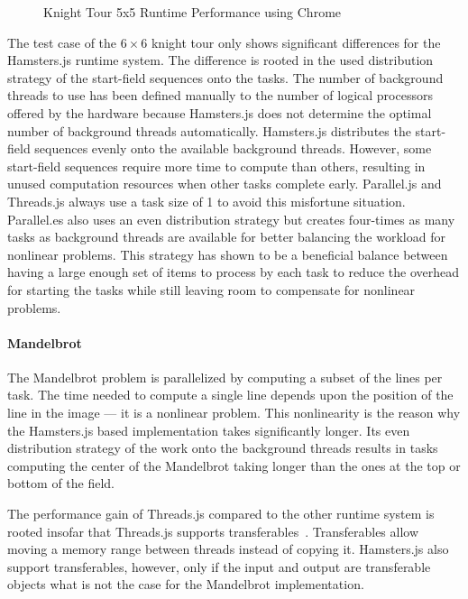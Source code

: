 \begin{figure}
	\centering
	
	\caption{Knight Tour 5x5 Runtime Performance using Chrome}
	\label{fig:runtime-performance-chrome}
\end{figure}

The test case of the $6\times6$ knight tour only shows significant differences for the Hamsters.js runtime system. The difference is rooted in the used distribution strategy of the start-field sequences onto the tasks. The number of background threads to use has been defined manually to the number of logical processors offered by the hardware because Hamsters.js does not determine the optimal number of background threads automatically. Hamsters.js distributes the start-field sequences evenly onto the available background threads. However, some start-field sequences require more time to compute than others, resulting in unused computation resources when other tasks complete early. Parallel.js and Threads.js always use a task size of 1 to avoid this misfortune situation. Parallel.es also uses an even distribution strategy but creates four-times as many tasks as background threads are available for better balancing the workload for nonlinear problems. This strategy has shown to be a beneficial balance between having a large enough set of items to process by each task to reduce the overhead for starting the tasks while still leaving room to compensate for nonlinear problems. 

\paragraph{Mandelbrot}
The Mandelbrot problem is parallelized by computing a subset of the lines per task. The time needed to compute a single line depends upon the position of the line in the image --- it is a nonlinear problem. This nonlinearity is the reason why the Hamsters.js based implementation takes significantly longer. Its even distribution strategy of the work onto the background threads results in tasks computing the center of the Mandelbrot taking longer than the ones at the top or bottom of the field. 

The performance gain of Threads.js compared to the other runtime system is rooted insofar that Threads.js supports transferables~\cite[Section 2.7.4]{w3cHtml5}. Transferables allow moving a memory range between threads instead of copying it. Hamsters.js also support transferables, however, only if the input and output are transferable objects what is not the case for the Mandelbrot implementation.

